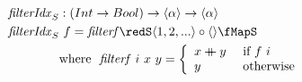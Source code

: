 \documentclass[preview]{standalone}
\begin{document}
\begin{align*}
  \mathit{filterIdx}_S &: (Int \rightarrow Bool) \rightarrow \vect{\alpha} \rightarrow \vect{\alpha} \\
  \mathit{filterIdx}_S &\ f = \mathit{filterf} \redS \vect{1,2,...} \circ \vect{} \fMapS\\
         & \text{where}\ \ \mathit{filterf}\ i\ x\ y = 
           \left\{\begin{array}{ll}
                    x \fcat y & \text{ if } f\ i\\
                    y & \text{ otherwise}
                  \end{array}
           \right.\\
\end{align*}
\end{document}
